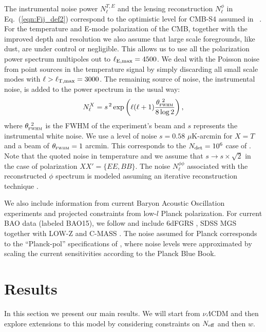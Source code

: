 \documentclass[aps,prd,reprint,superscriptaddress]{revtex4-1}
\newcommand\refeq[1]{Eq.~(\ref{eqn:#1})}
\begin{document}
The instrumental noise power $N_{\ell}^{T,E}$ and the lensing reconstruction $N_{\ell}^{\phi}$ in \refeq{Fij_def2} correspond to the optimistic level for CMB-S4 assumed in ~\cite{2013arXiv1309.5383A,wu:2014,2013PhRvD..87h3008H}.
For the temperature and E-mode polarization of the CMB, together with the improved depth and resolution we also assume that large scale foregrounds, like dust, are under control or negligible. This allows us to use all the polarization power spectrum multipoles out to $\ell_{\rm E,max}=4500$. We deal with the Poisson noise from point sources in the temperature signal by simply discarding all small scale modes with $\ell>\ell_{\rm T,max}=3000$.
The remaining source of noise, the instrumental noise, is added to the power spectrum in the usual way:
 \begin{equation}
 	\centering
		N^{X}_\ell = s^{\, 2} \exp \left(\ell(\ell+1) \frac{\theta^{\ 2}_{\textsc{fwhm}}}{8\log2}\right),
	\label{eq:beamnoise}
\end{equation}
where $\theta^{\ 2}_{\textsc{fwhm}}$ is the FWHM of the experiment's beam and $s$ represents the instrumental white noise.
We use a level of noise $s = 0.58$ $\mu$K-arcmin for $X=T$ and a beam of $\theta_{\textsc{fwhm}}=1$ arcmin. This corresponds to the $N_{\rm det}=10^{6}$ case of \cite{wu:2014}. 
Note that the quoted noise in temperature and we assume that $s \rightarrow s\times \sqrt{2}$ in the case of polarization $ XX' = \{ EE, BB \}$. 
The noise $N_\ell^{\phi\phi}$ associated with the reconstructed $\phi$ spectrum is modeled assuming an iterative reconstruction technique \cite{seljak:2004}. 

We also include information from current Baryon Acoustic Oscillation experiments and projected constraints from low-$l$ Planck polarization. 
For current BAO data (labeled BAO15), we follow \cite{allison:2015} and include 6dFGRS \cite{beutler:2011}, SDSS MGS \cite{ross:2015} together with LOW-Z and C-MASS \cite{anderson:2014}.
The noise assumed for Planck corresponds to the ``Planck-pol'' specifications of \cite{allison:2015}, where noise levels were approximated by scaling the current sensitivities according to the Planck Blue Book.


\section{Results \label{sec:results}}
In this section we present our main results. We will start from $\nu \Lambda$CDM and then explore extensions to this model by considering constraints on $N_{\rm eff}$ and then $w$.
\end{document}
